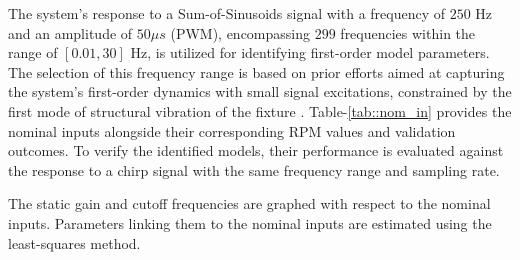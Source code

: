 
The system's response to a Sum-of-Sinusoids signal with a frequency of $250$ Hz and an amplitude of $50 \mu s$ (PWM), encompassing $299$ frequencies within the range of $[0.01, 30]$ Hz, is utilized for identifying first-order model parameters. The selection of this frequency range is based on prior efforts aimed at capturing the system's first-order dynamics with small signal excitations, constrained by the first mode of structural vibration of the fixture \cite{charla2022enhancing}. Table-\ref{tab::nom_in} provides the nominal inputs alongside their corresponding RPM values and validation outcomes. To verify the identified models, their performance is evaluated against the response to a chirp signal with the same frequency range and sampling rate.

The static gain and cutoff frequencies are graphed with respect to the nominal inputs. Parameters linking them to the nominal inputs are estimated using the least-squares method.

